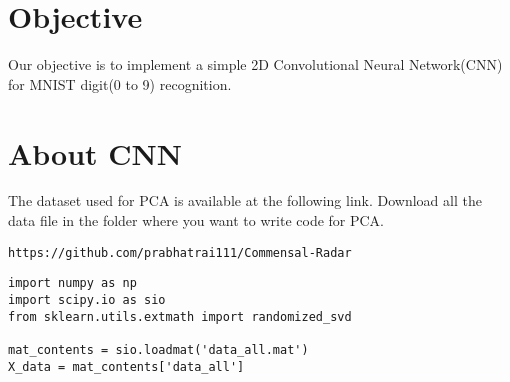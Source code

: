 \documentclass[journal,12pt,twocolumn]{IEEEtran}
\begin{document}
\section{Objective}
%
Our objective is to implement a simple 2D Convolutional Neural Network(CNN) for MNIST digit(0 to 9) recognition.
%
\section{About CNN}
The dataset used for PCA is available at the following link. Download all the data file in the folder where you want to write code for PCA.
\begin{lstlisting}
https://github.com/prabhatrai111/Commensal-Radar
\end{lstlisting}
\begin{lstlisting}
import numpy as np
import scipy.io as sio
from sklearn.utils.extmath import randomized_svd

mat_contents = sio.loadmat('data_all.mat')
X_data = mat_contents['data_all']
\end{lstlisting}
\end{document}
